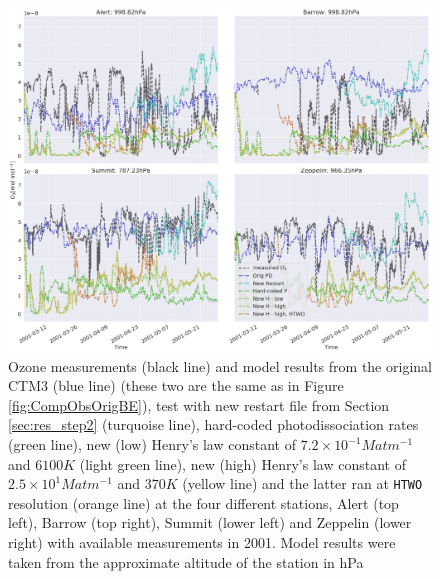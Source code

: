 \begin{figure}[ht]
    \centering
    \includegraphics[width=\linewidth]{Chapter6_Results/images/ozone_stationComp_2001/ozone_2001_step3.png}
    \caption{Ozone measurements (black line) and model results from the original CTM3 (blue line) (these two are the same as in Figure \ref{fig:CompObsOrigBE}), test with new restart file from Section \ref{sec:res_step2} (turquoise line), hard-coded photodissociation rates (green line), new (low) Henry's law constant of $7.2\times10^{-1} M atm ^{-1}$ and $6100 K$ (light green line), new (high) Henry's law constant of $2.5\times10^{1} M atm ^{-1}$ and $370 K$ (yellow line) and the latter ran at \texttt{HTWO} resolution (orange line) at the four different stations, Alert (top left), Barrow (top right), Summit (lower left) and Zeppelin (lower right) with available measurements in 2001. Model results were taken from the approximate altitude of the station in hPa \protect\footnotemark}
    \label{fig:ozone_2001_step3}
\end{figure}

